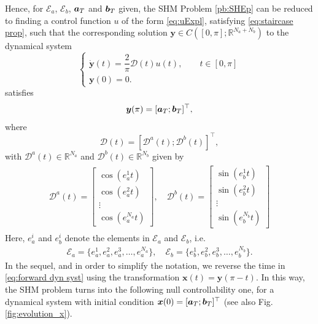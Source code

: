 \documentclass[twocolumn]{autart}    %
\begin{document}
Hence, for $\mathcal{E}_a$, $\mathcal{E}_b$, $\bm{a}_T$ and $\bm{b}_T$ given, the SHM Problem \ref{pb:SHEp} can be reduced to finding a control function $u$ of the form \eqref{eq:uExpl}, satisfying \eqref{eq:staircase prop}, such that the corresponding solution $\bm{y} \in C([0,\pi]; \mathbb{R}^{N_a+N_b})$ to the dynamical system
\begin{equation}\label{eq:forward dyn syst}
	\begin{cases}
		\dot{\bm{y}}(t) = \dfrac{2}{\pi} \bm{\mathcal{D}}(t) u(t), \qquad  t\in [0,\pi]
		\\[5pt]
		\bm{y}(0) = 0.
	\end{cases}
\end{equation}
satisfies
\begin{align*}
	\bm{y} (\pi) = [\bm{a}_T;\bm{b}_T]^\top,	
\end{align*}
where
\begin{equation}\label{eq:Dynamics}
	\bm{\mathcal{D}}(t) = \left[ \bm{\mathcal{D}}^a(t); \bm{\mathcal{D}}^b(t) \right]^\top, 
\end{equation}
with $\bm{\mathcal{D}}^a(t) \in \mathbb{R}^{N_a} $ and $ \bm{\mathcal{D}}^b(t) \in \mathbb{R}^{N_b}$ given by
\begin{gather}\label{eq:DalphaDbeta}
    \begin{align}
        \bm{\mathcal{D}}^a(t) = 
        \begin{bmatrix} 
            \cos(e_a^1t) \\ \cos(e_a^2t) \\ \vdots \\ \cos(e_a^{N_a}t) 
        \end{bmatrix},
        \quad \bm{\mathcal{D}}^b(t) = 
        \begin{bmatrix} 
            \sin(e_b^1t) \\ \sin(e_b^2t) \\ \vdots \\ \sin(e_b^{N_b}t)
        \end{bmatrix} 
    \end{align} 
\end{gather}
Here, $e_a^i$ and $e_b^i$  denote the elements in $\mathcal{E}_a$ and  $\mathcal{E}_b$, i.e.
\begin{align*}
	\mathcal{E}_a = \{e_a^1,e_a^2,e_a^3,\dots,e_a^{N_a}\}, \quad \mathcal{E}_b = \{e_b^1,e_b^2,e_b^3,\dots,e_b^{N_b}\}.
\end{align*}
In the sequel, and in order to simplify the notation, we reverse the time in \eqref{eq:forward dyn syst} using the transformation $\bm{x} (t) = \bm{y}(\pi - t)$. In this way, the SHM problem turns into the following null controllability one, for a dynamical system with initial condition $\bm{x}(0) = [\bm{a}_T; \bm{b}_T]^\top$ (see also Fig. \ref{fig:evolution_x}).
\end{document}
